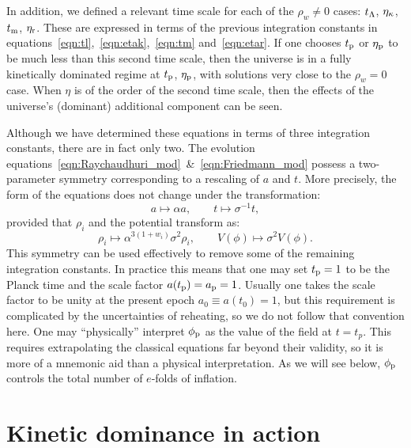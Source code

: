 In addition, we defined a relevant time scale for each of the \(\rho_w \neq 0\) cases: \(t_\mathrm{\Lambda}\), \(\eta_\mathrm{\kappa}\), \(t_{\mathrm{m}}\), \(\eta_{\mathrm{r}}\). These are expressed in terms of the previous integration constants in equations~\eqref{eqn:tl},~\eqref{eqn:etak},~\eqref{eqn:tm} and~\eqref{eqn:etar}. If one chooses \(t_{\mathrm{p}}\) or \(\eta_{\mathrm{p}}\) to be much less than this second time scale, then the universe is in a fully kinetically dominated regime at \(t_{\mathrm{p}}\), \(\eta_{\mathrm{p}}\), with solutions very close to the \(\rho_w=0\) case. When \(\eta\) is of the order of the second time scale, then the effects of the universe's (dominant) additional component can be seen.

Although we have determined these equations in terms of three integration constants, there are in fact only two.  The evolution equations~\eqref{eqn:Raychaudhuri_mod}~\&~\eqref{eqn:Friedmann_mod} possess a two-parameter symmetry corresponding to a rescaling of \(a\) and \(t\). More precisely, the form of the equations does not change under the transformation:
%
\begin{equation}
  a\mapsto\alpha a, 
  \qquad 
  t \mapsto\sigma^{-1}t,
\end{equation}
%
provided that \(\rho_i\) and the potential transform as:
%
\begin{equation}
  \rho_i \mapsto \alpha^{3(1+w_i)}\sigma^2\rho_i, 
  \qquad
  V(\phi) \mapsto \sigma^2 V(\phi).
\end{equation}
%
This symmetry can be used effectively to remove some of the remaining integration constants. In practice this means that one may set \(t_{\mathrm{p}}=1\) to be the Planck time and the scale factor \(a(t_{\mathrm{p}})=a_{\mathrm{p}}=1\). Usually one takes the scale factor to be unity at the present epoch \(a_0\equiv a(t_0)=1\), but this requirement is complicated by the uncertainties of reheating, so we do not follow that convention here. One may ``physically'' interpret \(\phi_{\mathrm{p}}\) as the value of the field at \(t=t_p\).  This requires extrapolating the classical equations far beyond their validity, so it is more of a mnemonic aid than a physical interpretation.  As we will see below, \(\phi_{\mathrm{p}}\) controls the total number of \(e\)-folds of inflation.













\section{Kinetic dominance in action}
\label{sec:Kinetic_dominance_in_action}

